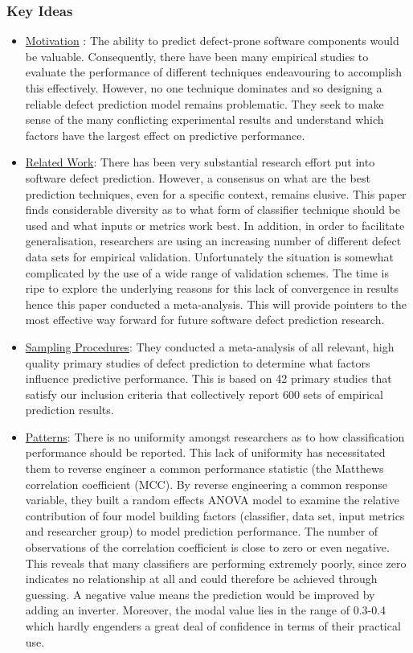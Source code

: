 \documentclass[conference]{IEEEtran}
\begin{document}
\subsubsection{\textbf{Key Ideas}}
\begin{itemize}
    \item \underline{Motivation} : The ability to predict defect-prone software components would be valuable. Consequently, there have been many empirical studies to evaluate the performance of different techniques endeavouring to accomplish this effectively. However, no one technique dominates and so designing a reliable defect prediction model remains problematic. They seek to make sense of the many conflicting experimental results and understand which factors have the largest effect on predictive performance.
    \item \underline{Related Work}: There has been very substantial research effort put into software defect prediction. However, a consensus on what are the best prediction techniques, even for a specific context, remains elusive. This paper finds considerable diversity as to what form of classifier technique should be used and what inputs or metrics work best. In addition, in order to facilitate generalisation, researchers are using an increasing number of different defect data sets for empirical validation. Unfortunately the situation is somewhat complicated by the use of a wide range of validation schemes. The time is ripe to explore the underlying reasons for this lack of convergence in results hence this paper conducted a meta-analysis. This will provide pointers to the most effective way forward for future software defect prediction research.
    \item \underline{Sampling Procedures}: They conducted a meta-analysis of all relevant, high quality primary studies of defect prediction to determine what factors influence predictive performance. This is based on 42 primary studies that satisfy our inclusion criteria that collectively report 600 sets of empirical prediction results.
    \item \underline{Patterns}: There is no uniformity amongst researchers as to how classification performance should be reported. This lack of uniformity has necessitated them to reverse engineer a common performance statistic (the Matthews correlation coefficient (MCC). By reverse engineering a common response variable, they built a random effects ANOVA model to examine the relative contribution of four model building factors (classifier, data set, input metrics and researcher group) to model prediction performance. The number of observations of the correlation coefficient is close to zero or even negative. This reveals that many classifiers are performing extremely poorly, since zero indicates no relationship at all and could therefore be achieved through guessing. A negative value means the prediction would be improved by adding an inverter. Moreover, the modal value lies in the range of 0.3-0.4 which hardly engenders a great deal of confidence in terms of their practical use.
\end{itemize}
\end{document}
